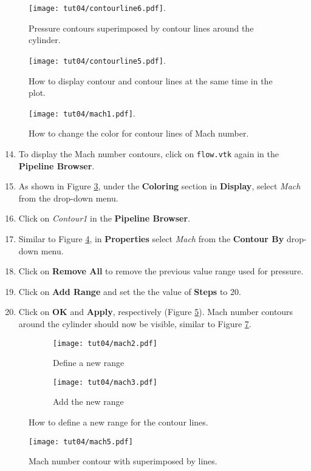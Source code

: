 \begin{figure}[ht]
    \centering
    \texttt{[image: tut04/contourline6.pdf]}.
    \caption{Pressure contours superimposed by contour lines around the cylinder.}
    \label{fig4:contourline6_4}
\end{figure}
\begin{figure}[ht]
    \centering
    \texttt{[image: tut04/contourline5.pdf]}.
    \caption{How to display contour and contour lines at the same time in the plot.}
    \label{fig4:contourline5_4}
\end{figure}
\begin{figure}[ht]
	\centering
	\texttt{[image: tut04/mach1.pdf]}.
	\caption{How to change the color for contour lines of Mach number.}
	\label{fig4:mach1_4}
\end{figure}
\begin{enumerate}[label=\arabic*)]
	\setcounter{enumi}{13}
	\item To display the Mach number contours, click on \texttt{flow.vtk} again in the \textbf{Pipeline Browser}.
	\item As shown in Figure \ref{fig4:mach1_4}, under the \textbf{Coloring} section in \textbf{Display}, select \textit{Mach} from the drop-down menu.
	\item Click on \textit{Contour1} in the \textbf{Pipeline Browser}.
	\item Similar to Figure \ref{fig4:mach2_4 a}, in \textbf{Properties} select \textit{Mach} from the \textbf{Contour By} drop-down menu.
	\item Click on \textbf{Remove All} to remove the previous value range used for pressure.
	\item Click on \textbf{Add Range} and set the the value of \textbf{Steps} to 20. 
	\item Click on \textbf{OK} and \textbf{Apply}, respectively (Figure \ref{fig4:mach2_4 b}). Mach number contours around the cylinder should now be visible, similar to Figure \ref{fig4:mach5_4}.
\end{enumerate}
\begin{figure}[H]
    \centering
    \begin{subfigure}[b]{0.4\textwidth}
        \centering
        \texttt{[image: tut04/mach2.pdf]}
        \caption{Define a new range}
        \label{fig4:mach2_4 a}
    \end{subfigure}
    \hfill
    \begin{subfigure}[b]{.4\textwidth}
        \centering
        \texttt{[image: tut04/mach3.pdf]}
        \caption{Add the new range}
        \label{fig4:mach2_4 b}
    \end{subfigure}     
    \caption{How to define a new range for the contour lines.}
    \label{fig4:mach2_4}
\end{figure}
\begin{figure}[ht]
    \centering
    \texttt{[image: tut04/mach5.pdf]}
    \caption{Mach number contour with superimposed by lines.}
    \label{fig4:mach5_4}
\end{figure}
